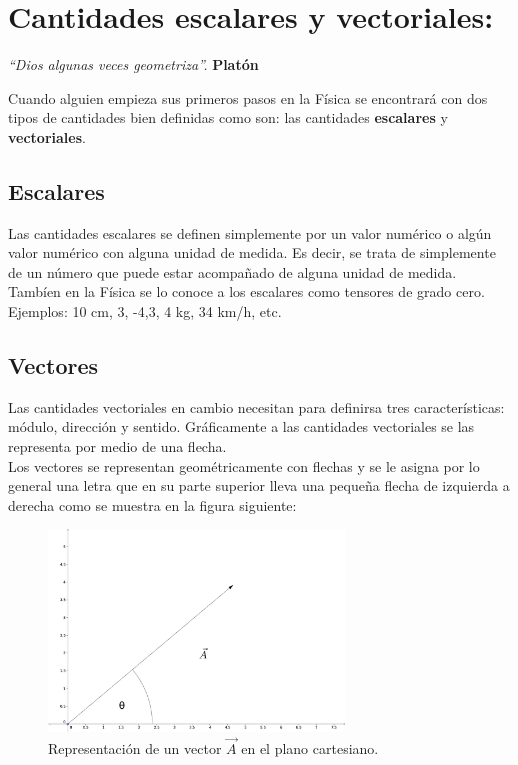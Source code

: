 \chapter{Cantidades escalares y vectoriales:}

\textit{``Dios algunas veces geometriza''.} \textbf{Platón} 
\vspace{1.00cm}

Cuando alguien empieza sus primeros pasos en la Física se encontrará con dos tipos de cantidades bien definidas como son: las 
cantidades \textbf{escalares} y \textbf{vectoriales}.\\

\section{Escalares}

Las cantidades escalares se definen simplemente por un valor numérico o algún valor numérico con alguna unidad de 
medida. Es decir, se trata de simplemente de un número que puede estar acompañado de alguna unidad de medida. Tambíen 
en la Física se lo conoce a los escalares como tensores de grado cero. Ejemplos: 10 cm, 3, -4,3, 4 kg, 34 km/h, etc.

\section{Vectores}

Las cantidades vectoriales en cambio necesitan para definirsa tres características: módulo, dirección y sentido. 
Gráficamente a las cantidades vectoriales se las representa por medio de una flecha.\\

Los vectores se representan geométricamente con flechas y se le asigna por lo general una letra que en su parte 
superior lleva una pequeña flecha de izquierda a derecha como se muestra en la figura siguiente:\\  

\begin{figure}[H]
   \centering
\includegraphics[width=0.7\textwidth]{images/vector_uno.eps}
  \caption{\small{Representación de un vector $\vec{A}$ en el plano cartesiano.}}
   \end{figure}

